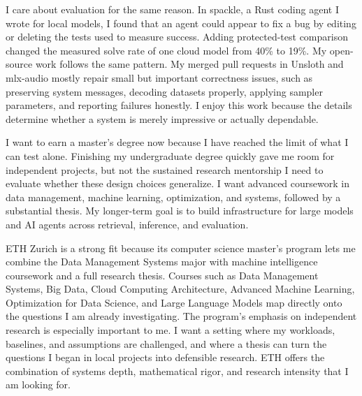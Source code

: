 \documentclass[11pt]{article}
\begin{document}
I care about evaluation for the same reason. In spackle, a Rust coding agent I wrote for local models, I found that an agent could appear to fix a bug by editing or deleting the tests used to measure success. Adding protected-test comparison changed the measured solve rate of one cloud model from 40\% to 19\%. My open-source work follows the same pattern. My merged pull requests in Unsloth and mlx-audio mostly repair small but important correctness issues, such as preserving system messages, decoding datasets properly, applying sampler parameters, and reporting failures honestly. I enjoy this work because the details determine whether a system is merely impressive or actually dependable.

I want to earn a master's degree now because I have reached the limit of what I can test alone. Finishing my undergraduate degree quickly gave me room for independent projects, but not the sustained research mentorship I need to evaluate whether these design choices generalize. I want advanced coursework in data management, machine learning, optimization, and systems, followed by a substantial thesis. My longer-term goal is to build infrastructure for large models and AI agents across retrieval, inference, and evaluation.

ETH Zurich is a strong fit because its computer science master's program lets me combine the Data Management Systems major with machine intelligence coursework and a full research thesis. Courses such as Data Management Systems, Big Data, Cloud Computing Architecture, Advanced Machine Learning, Optimization for Data Science, and Large Language Models map directly onto the questions I am already investigating. The program's emphasis on independent research is especially important to me. I want a setting where my workloads, baselines, and assumptions are challenged, and where a thesis can turn the questions I began in local projects into defensible research. ETH offers the combination of systems depth, mathematical rigor, and research intensity that I am looking for.
\end{document}
